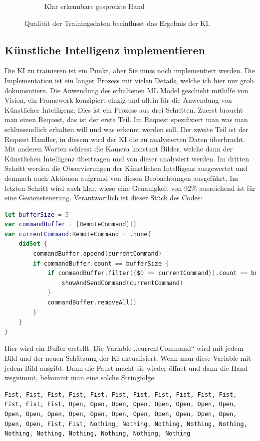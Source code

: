 \documentclass[12pt]{article}
\begin{document}
\begin{figure}
\begin{subfigure}[b]{0.475\textwidth}
            \caption[]%
            {{\small Klar erkennbare gespreizte Hand}}    
            \label{fig:klaroffen}
        \end{subfigure}
        \caption[]
        {\small Qualität der Trainingsdaten beeinflusst das Ergebnis der KI.} 
        \label{fig:qualityoftraining}
    \end{figure}
\newpage
\subsection{Künstliche Intelligenz implementieren}
Die KI zu trainieren ist ein Punkt, aber Sie muss noch implementiert werden. Die Implementation ist ein langer Prozess mit vielen Details, welche ich hier nur grob dokumentiere. Die Anwendung des erhaltenen ML Model geschieht mithilfe von Vision, ein Framework konzipiert einzig und allein für die Anwendung von Künstlicher Intelligenz. Dies ist ein Prozess aus drei Schritten. Zuerst braucht man einen Request, das ist der erste Teil. Im Request spezifiziert man was man schlussendlich erhalten will und was erkennt werden soll. Der zweite Teil ist der Request Handler, in diesem wird der KI die zu analysierten Daten überbracht. Mit anderen Worten schiesst die Kamera konstant Bilder, welche dann der Künstlichen Intelligenz übertragen und von dieser analysiert werden. Im dritten Schritt werden die Observierungen der Künstlichen Intelligenz ausgewertet und demnach auch Aktionen aufgrund von diesen Beobachtungen ausgeführt. \cite{gesturecontrolvideo} Im letzten Schritt wird auch klar, wieso eine Genauigkeit von 92\% ausreichend ist für eine Gestensteuerung. Verantwortlich ist dieser Stück des Codes: 
\begin{lstlisting}[language=Swift,caption={KI Buffer},label={lst:buffer}]
let bufferSize = 5
var commandBuffer = [RemoteCommand]()
var currentCommand:RemoteCommand = .none{
    didSet {
        commandBuffer.append(currentCommand)
        if commandBuffer.count == bufferSize {
            if commandBuffer.filter({$0 == currentCommand}).count == bufferSize{
                showAndSendCommand(currentCommand)
            }
            commandBuffer.removeAll()
        }
    }
}
\end{lstlisting}
Hier wird ein Buffer erstellt. Die Variable ,,currentCommand`` wird mit jedem Bild und der neuen Schätzung der KI aktualisiert. Wenn man diese Variable mit jedem Bild ausgibt. Dann die Faust macht sie wieder öffnet und dann die Hand wegnimmt, bekommt man eine solche Stringfolge:
\begin{lstlisting}[caption={Output KI-Resultate},label={lst:outputKI}]
Fist, Fist, Fist, Fist, Fist, Fist, Fist, Fist, Fist, Fist, Fist, Fist, Fist, Fist, Open, Open, Open, Open, Open, Open, Open, Open, Open, Open, Open, Open, Open, Open, Open, Open, Open, Open, Open, Open, Open, Fist, Fist, Nothing, Nothing, Nothing, Nothing, Nothing, Nothing, Nothing, Nothing, Nothing, Nothing, Nothing
\end{lstlisting}
\end{document}
